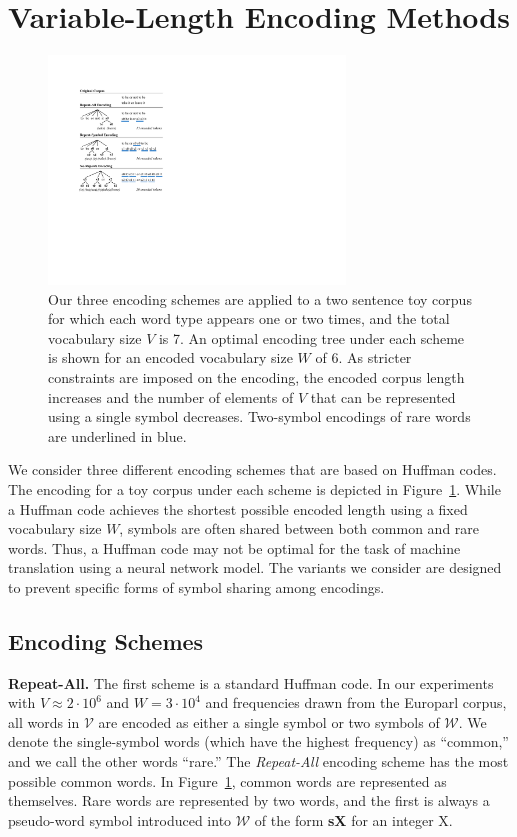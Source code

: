 \section{Variable-Length Encoding Methods}
\label{sec:encoding}

\begin{figure}
\includegraphics[width=3.1in]{images/examples}
\caption{Our three encoding schemes are applied to a two sentence toy corpus
for which each word type appears one or two times, and the total vocabulary
size $V$ is 7. An optimal encoding tree under each scheme is shown for an
encoded vocabulary size $W$ of 6. As stricter constraints are imposed on the
encoding, the encoded corpus length increases and the number of elements of $V$
that can be represented using a single symbol decreases. Two-symbol encodings
of rare words are underlined in blue.}
\label{fig:examples}
\end{figure}

We consider three different encoding schemes that are based on Huffman codes.
The encoding for a toy corpus under each scheme is depicted in
Figure~\ref{fig:examples}. While a Huffman code achieves the shortest possible
encoded length using a fixed vocabulary size $W$, symbols are often shared
between both common and rare words. Thus, a Huffman code may not be optimal for
the task of machine translation using a neural network model. The variants we
consider are designed to prevent specific forms of symbol sharing among
encodings.

\subsection{Encoding Schemes}

\noindent\textbf{Repeat-All.}
The first scheme is a standard Huffman code. In our experiments with
$V\approx2\cdot10^6$ and $W=3\cdot10^4$ and frequencies drawn from the Europarl
corpus, all words in $\mathcal{V}$ are encoded as either a single symbol or two
symbols of $\mathcal{W}$. We denote the single-symbol words (which have the
highest frequency) as ``common,'' and we call the other words ``rare.'' The
\emph{Repeat-All} encoding scheme has the most possible common words. In
Figure~\ref{fig:examples}, common words are represented as themselves. Rare
words are represented by two words, and the first is always a pseudo-word
symbol introduced into $\mathcal{W}$ of the form \textbf{sX} for an integer X.


